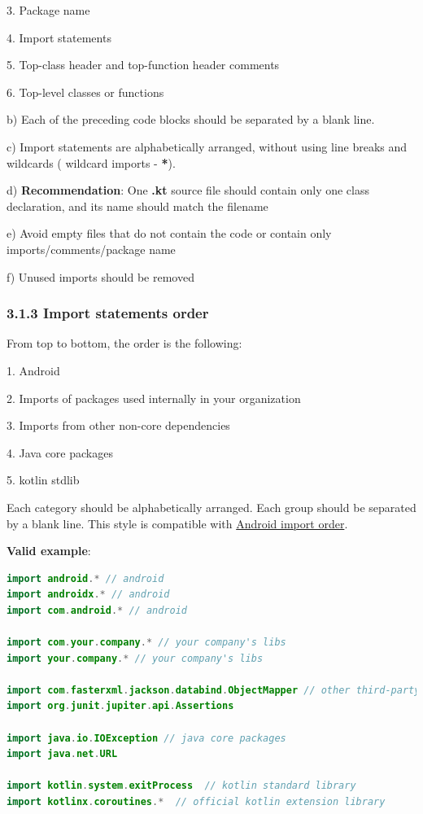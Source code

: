 3.	Package name

4.	Import statements

5.	Top-class header and top-function header comments

6.	Top-level classes or functions



b) Each of the preceding code blocks should be separated by a blank line. 



c) Import statements are alphabetically arranged, without using line breaks and wildcards ( wildcard imports - \textbf{*}). 



d) \textbf{Recommendation}: One \textbf{.kt} source file should contain only one class declaration, and its name should match the filename



e) Avoid empty files that do not contain the code or contain only imports/comments/package name



f) Unused imports should be removed

\subsubsection*{\textbf{3.1.3 Import statements order}}
\leavevmode\newline

\label{sec:3.1.3}



From top to bottom, the order is the following:

1. Android

2. Imports of packages used internally in your organization

3. Imports from other non-core dependencies

4. Java core packages

5. kotlin stdlib



Each category should be alphabetically arranged. Each group should be separated by a blank line. This style is compatible with  \href{https://source.android.com/setup/contribute/code-style#order-import-statements}{Android import order}.



\textbf{Valid example}:

\begin{lstlisting}[language=Kotlin]
import android.* // android
import androidx.* // android
import com.android.* // android

import com.your.company.* // your company's libs
import your.company.* // your company's libs

import com.fasterxml.jackson.databind.ObjectMapper // other third-party dependencies
import org.junit.jupiter.api.Assertions

import java.io.IOException // java core packages
import java.net.URL

import kotlin.system.exitProcess  // kotlin standard library
import kotlinx.coroutines.*  // official kotlin extension library
\end{lstlisting}


